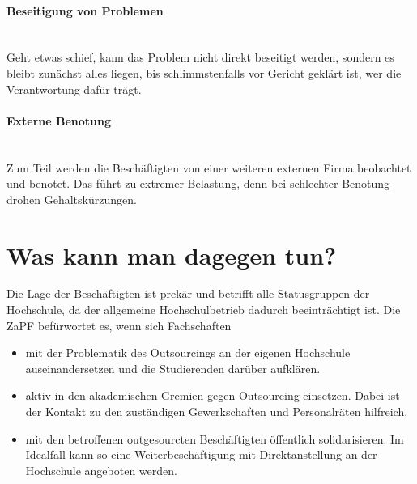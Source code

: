 \documentclass[DIV=calc]{scrartcl}
\begin{document}
\vspace{-5mm}\paragraph{Beseitigung von Problemen} \mbox{}\\
Geht etwas schief, kann das Problem nicht direkt beseitigt werden, sondern es bleibt zunächst alles liegen, bis schlimmstenfalls vor Gericht geklärt ist, wer die Verantwortung dafür trägt.

\vspace{-5mm}\paragraph{Externe Benotung} \mbox{}\\
Zum Teil werden die Beschäftigten von einer weiteren externen Firma beobachtet und benotet. Das führt zu extremer Belastung, denn bei schlechter Benotung drohen Gehaltskürzungen.

\vspace{-5mm}\section*{Was kann man dagegen tun?} \vspace{-5mm}
Die Lage der Beschäftigten ist prekär und betrifft alle Statusgruppen der Hochschule, da der allgemeine Hochschulbetrieb dadurch beeinträchtigt ist. Die ZaPF befürwortet es, wenn sich Fachschaften

\begin{itemize}
    \item mit der Problematik des Outsourcings an der eigenen Hochschule auseinandersetzen und die Studierenden darüber aufklären.
    \item aktiv in den akademischen Gremien gegen Outsourcing einsetzen. Dabei ist der Kontakt zu den zuständigen Gewerkschaften und Personalräten hilfreich.
    \item mit den betroffenen outgesourcten Beschäftigten öffentlich solidarisieren. Im Idealfall kann so eine Weiterbeschäftigung mit Direktanstellung an der Hochschule angeboten werden.
\end{itemize}
\end{document}
